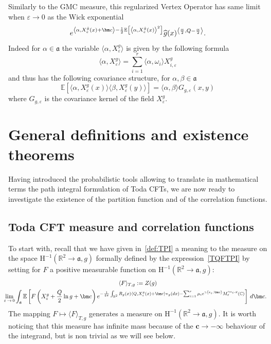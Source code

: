 \documentclass[AHL,Unicode,longabstracts,published]{cedram}
\newcommand{\frka}{\mathfrak{a}}
\newcommand{\rmv}{\mathrm{v}}
\newcommand{\rmH}{\mathrm{H}}
\newcommand{\C}{\mathbb{C}}
\newcommand{\R}{\mathbb{R}}
\newcommand{\E}{\mathbb{E}}
\newcommand*\eps{\varepsilon}
\newcommand{\expect}[1]{\mathbb{E}\left[#1\right]}
\let\oldhat\hat
\renewcommand*{\hat}[1]{\mathchoice{\widehat{#1}}{\widehat{#1}}{\oldhat{#1}}{\oldhat{#1}}}
\begin{document}
Similarly to the GMC measure, this regularized Vertex Operator has same limit when $\eps\rightarrow0$ as the Wick exponential
\begin{equation}\label{VO_wick}
e^{\left\langle\alpha, X^{\hat g}_\eps(x) + \bm c\right\rangle-\frac12\expect{\left\langle\alpha, X^{\hat g}_\eps(x)\right\rangle^2}} \hat g(x)^{\left\langle\frac{\alpha}2,Q-\frac{\alpha }2\right\rangle}.
\end{equation}
Indeed for $\alpha\in \frka$ the variable $ \langle\alpha, X^g_\eps \rangle$ is given by the following formula
\begin{equation*}
\langle\alpha, X^g_\eps \rangle= \sum_{i=1}^{r} \langle\alpha,\omega_i\rangle X^g_{i,\eps}
\end{equation*}
and thus has the following covariance structure, for $\alpha,\beta\in\frka$
\begin{equation}\label{covX}
\E\left[\langle\alpha, X^g_\eps(x) \rangle \langle\beta, X^g_\eps(y) \rangle\right] = \langle\alpha, \beta \rangle G_{g,\eps}(x,y)
\end{equation}
where $G_{g,\eps}$ is the covariance kernel of the field $X^g_{\eps}$.



\section{General definitions and existence theorems}

Having introduced the probabilistic tools allowing to translate in mathematical terms the path integral formulation of Toda CFTs, we are now ready to investigate the existence of the partition function and of the correlation functions.

\subsection{Toda CFT measure and correlation functions}


To start with, recall that we have given in~\eqref{def:TPI} a meaning to the measure on the space $\rmH^{-1}(\R^2\to \frka,g)$ formally defined by the expression~\eqref{TQFTPI} by setting for $F$ a positive measurable function on $\rmH^{-1}(\R^2\to \frka,g)$:
\begin{multline*}
\langle F\rangle_{T,g} :=Z(g)\\
\mkern-15mu\lim\limits_{\eps\,\rightarrow\,0}\int_{\frka}\E\left[F\left(X^g_\eps+\frac Q2\ln g+\bm c\right)e^{-\frac{1}{4 \pi} \int_{\R^2} R_g(x) \left\langle Q, X^g_\eps(x)+\bm c \right\rangle \rmv_ g(dx) -\sum_{i=1}^{r} \mu_i e^{\gamma \left\langle e_i, \bm c\right\rangle }M^{ \gamma e_i,g}_\eps(\C) }\right]\,d\bm c.
\end{multline*}
The mapping $F\mapsto \langle F\rangle_{T,g}$ generates a measure on $\rmH^{-1}(\R^2\to \frka,g)$. It is worth noticing that this measure has infinite mass because of the $\bm c \rightarrow -\infty$ behaviour of the integrand, but is non trivial as we will see below.
\end{document}
